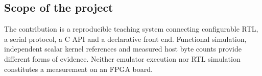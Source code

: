 \subsection{Scope of the project}

The contribution is a reproducible teaching system connecting configurable
RTL, a serial protocol, a C API and a declarative front end. Functional
simulation, independent scalar kernel references and measured host byte
counts provide different forms of evidence. Neither emulator execution nor
RTL simulation constitutes a measurement on an FPGA board.
